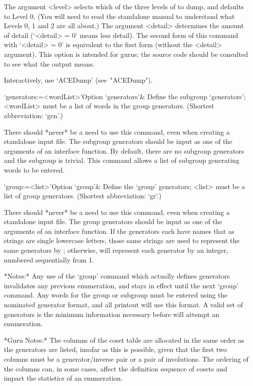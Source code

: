 The argument <level> selects which of the three levels  of  {\ACE}  to
dump, and defaults to Level 0. (You will need to read  the  standalone
manual to understand what Levels 0,  1  and  2  are  all  about.)  The
argument <detail> determines the amount  of  detail  (`<detail>  =  0'
means less detail). The second form of this command with  `<detail>  =
0' is equivalent to the first form (without  the  <detail>  argument).
This option is intended for gurus; the source code should be consulted
to see what the output means.

Interactively, use `ACEDump' (see~"ACEDump").

\>`generators:=<wordList>'{Option `generators'}&
Define the subgroup `generators'; <wordList> must be a list  of  words
in the group generators.
(Shortest abbreviation: `gen'.)

There should *never* be a need to use this command, even when creating
a standalone input file. The subgroup generators should  be  input  as
one of the arguments of an  {\ACE}  interface  function.  By  default,
there are no subgroup generators and the  subgroup  is  trivial.  This
command allows a list of subgroup generating words to be entered.

\>`group:=<list>'{Option `group'}&
Define the `group' generators; <list> must be a list of  {\GAP}  group
generators.
(Shortest abbreviation: `gr'.)

There should *never* be a need to use this command, even when creating
a standalone input file. The group generators should be input  as  one
of the arguments of an {\ACE} interface function.  If  the  generators
each have names that as strings are single  lowercase  letters,  those
same strings are used to represent  the  same  generators  by  {\ACE};
otherwise,  {\ACE}  will  represent  each  generator  by  an  integer,
numbered sequentially from 1.

*Notes:*
Any use of the  `group'  command  which  actually  defines  generators
invalidates any previous enumeration, and stays in  effect  until  the
next `group' command. Any words for the  group  or  subgroup  must  be
entered using the nominated generator format, and  all  printout  will
use this format. A valid set of generators is the minimum  information
necessary before {\ACE} will attempt an enumeration.

*Guru Notes:*
The columns of the coset table are allocated in the same order as  the
generators are listed, insofar as this is  possible,  given  that  the
first two columns must be  a  generator/inverse  pair  or  a  pair  of
involutions. The ordering of the columns can, in  some  cases,  affect
the definition sequence of cosets and  impact  the  statistics  of  an
enumeration.

